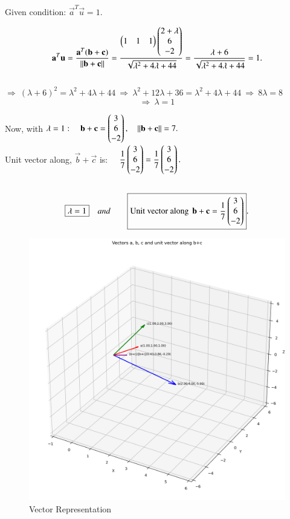 \documentclass[journal]{IEEEtran}
\begin{document}
Given condition: $\vec{a}^T\vec{u}=1.$  

$$ \mathbf{a}^T\mathbf{u} = \dfrac{\mathbf{a}^T(\mathbf{b}+\mathbf{c})}{\|\mathbf{b}+\mathbf{c}\|}
= \dfrac{\begin{pmatrix}1 & 1 & 1\end{pmatrix}\begin{pmatrix}2+\lambda\\6\\-2\end{pmatrix}}
{\sqrt{\lambda^2+4\lambda+44}}
= \dfrac{\lambda+6}{\sqrt{\lambda^2+4\lambda+44}}=1.
$$ \\


$
\Rightarrow\ (\lambda+6)^2=\lambda^2+4\lambda+44
\ \Longrightarrow\ 
\lambda^2+12\lambda+36=\lambda^2+4\lambda+44
\ \Longrightarrow\ 
8\lambda=8\ $
$$\Longrightarrow\ 
\boxed{\lambda=1}$$

Now, with $\lambda=1:\quad \mathbf{b}+\mathbf{c}
=\begin{pmatrix}3\\6\\-2\end{pmatrix},\quad \|\mathbf{b}+\mathbf{c}\| = 7.$ \\

Unit vector along, $\vec{b}+\vec{c}$ is: $\quad \dfrac{1}{7}\begin{pmatrix}3\\6\\-2\end{pmatrix}
= \dfrac{1}{7}\begin{pmatrix}3\\6\\-2\end{pmatrix}.$\\\\
\bigskip
\begin{align}   
\centering
\boxed{\lambda=1} \quad and \qquad 
\boxed{\text{Unit vector along }\,\vec{b}+\vec{c}
=\dfrac{1}{7}\myvec{3\\6\\-2}}.
\end{align}

\bigskip

\begin{figure}[htbp]
    \centering
    \includegraphics[width=0.8\linewidth]{figs/fig1.png}
    \caption{Vector Representation}
    \label{fig:fig/fig1.png}
\end{figure}
\end{document}
